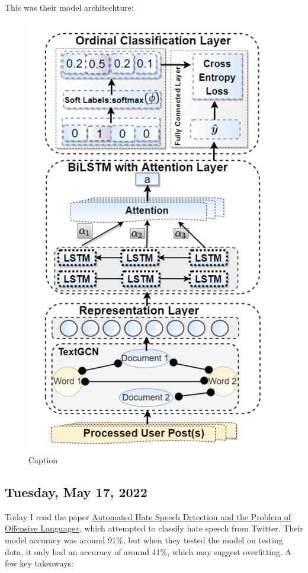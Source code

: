 \documentclass[11pt,letterpaper]{article}
\begin{document}
This was their model architechture:
\begin{figure}
    \centering
    \includegraphics[scale=0.5]{images/id_depress_arch.png}
    \caption{Caption}
    \label{fig:my_label}
\end{figure}

\subsection{Tuesday, May 17, 2022}
Today I read the paper \href{https://arxiv.org/pdf/1703.04009v1.pdf}{Automated Hate Speech Detection and the Problem of Offensive Language∗}, which attempted to classify hate speech from Twitter. Their model accuracy was around 91\%, but when they tested the model on testing data, it only had an accuracy of around 41\%, which may suggest overfitting. A few key takeaways:
\end{document}
